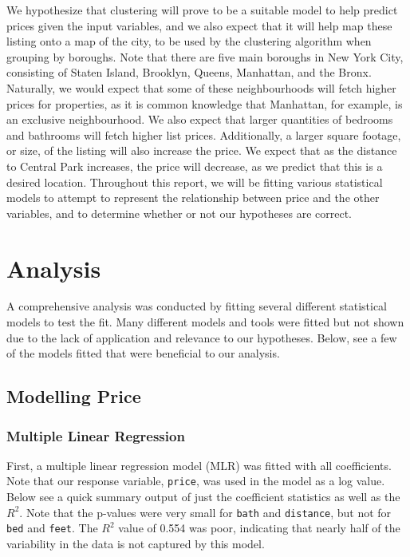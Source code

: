 \documentclass[11pt, a4paper]{article}
\begin{document}
We hypothesize that clustering will prove to be a suitable model to help predict prices given the input variables, and we also expect that it will help map these listing onto a map of the city, to be used by the clustering algorithm when grouping by boroughs. Note that there are five main boroughs in New York City, consisting of Staten Island, Brooklyn, Queens, Manhattan, and the Bronx. Naturally, we would expect that some of these neighbourhoods will fetch higher prices for properties, as it is common knowledge that Manhattan, for example, is an exclusive neighbourhood. We also expect that larger quantities of bedrooms and bathrooms will fetch higher list prices. Additionally, a larger square footage, or size, of the listing will also increase the price. We expect that as the distance to Central Park increases, the price will decrease, as we predict that this is a desired location. Throughout this report, we will be fitting various statistical models to attempt to represent the relationship between price and the other variables, and to determine whether or not our hypotheses are correct.


\pagebreak

\section{Analysis}

A comprehensive analysis was conducted by fitting several different statistical models to test the fit. Many different models and tools were fitted but not shown due to the lack of application and relevance to our hypotheses. Below, see a few of the models fitted that were beneficial to our analysis.

\subsection{Modelling Price}

\subsubsection{Multiple Linear Regression}

First, a multiple linear regression model (MLR) was fitted with all coefficients. Note that our response variable, \texttt{price}, was used in the model as a log value. Below see a quick summary output of just the coefficient statistics as well as the $R^2$. Note that the p-values were very small for \texttt{bath} and \texttt{distance}, but not for \texttt{bed} and \texttt{feet}. The $R^2$ value of 0.554 was poor, indicating that nearly half of the variability in the data is not captured by this model.
\end{document}
